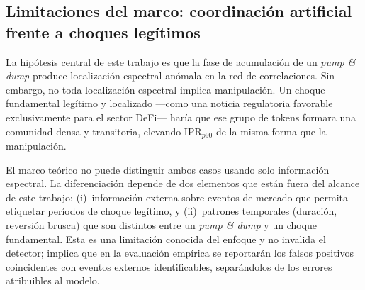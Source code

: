 \subsection{Limitaciones del marco: coordinación artificial frente a
choques legítimos}

La hipótesis central de este trabajo es que la fase de acumulación de un
\emph{pump \& dump} produce localización espectral anómala en la red de
correlaciones. Sin embargo, no toda localización espectral implica
manipulación. Un choque fundamental legítimo y localizado ---como una
noticia regulatoria favorable exclusivamente para el sector DeFi--- haría
que ese grupo de tokens formara una comunidad densa y transitoria, elevando
$\mathrm{IPR}_{p90}$ de la misma forma que la manipulación.

El marco teórico no puede distinguir ambos casos usando solo información
espectral. La diferenciación depende de dos elementos que están fuera del
alcance de este trabajo: (i)~información externa sobre eventos de mercado
que permita etiquetar períodos de choque legítimo, y (ii)~patrones
temporales (duración, reversión brusca) que son distintos entre un
\emph{pump \& dump} y un choque fundamental. Esta es una limitación
conocida del enfoque y no invalida el detector; implica que en la
evaluación empírica se reportarán los falsos positivos coincidentes con
eventos externos identificables, separándolos de los errores atribuibles
al modelo.
